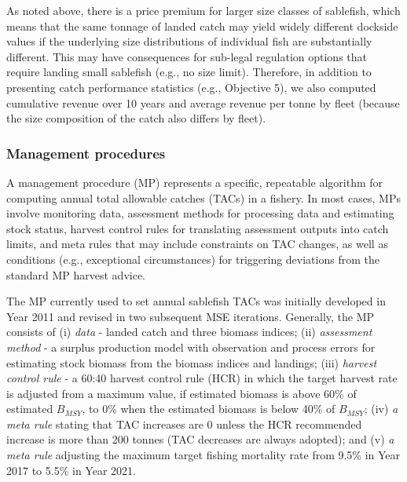 \documentclass[11pt]{book}
\begin{document}
As noted above, there is a price premium for larger size classes of sablefish, which means that the same tonnage of landed catch may yield widely different dockside values if the underlying size distributions of individual fish are substantially different. This may have consequences for sub-legal regulation options that require landing small sablefish (e.g., no size limit). Therefore, in addition to presenting catch performance statistics (e.g., Objective 5), we also computed cumulative revenue over 10 years and average revenue per tonne by fleet (because the size composition of the catch also differs by fleet).

\hypertarget{management-procedures}{%
\subsubsection{Management procedures}\label{management-procedures}}

A management procedure (MP) represents a specific, repeatable algorithm for computing annual total allowable catches (TACs) in a fishery. In most cases, MPs involve monitoring data, assessment methods for processing data and estimating stock status, harvest control rules for translating assessment outputs into catch limits, and meta rules that may include constraints on TAC changes, as well as conditions (e.g., exceptional circumstances) for triggering deviations from the standard MP harvest advice.

The MP currently used to set annual sablefish TACs was initially developed in Year 2011 and revised in two subsequent MSE iterations. Generally, the MP consists of (i) \emph{data} - landed catch and three biomass indices; (ii) \emph{assessment method} - a surplus production model with observation and process errors for estimating stock biomass from the biomass indices and landings; (iii) \emph{harvest control rule} - a 60:40 harvest control rule (HCR) in which the target harvest rate is adjusted from a maximum value, if estimated biomass is above 60\% of estimated \(B_{MSY}\), to 0\% when the estimated biomass is below 40\% of \(B_{MSY}\); (iv) \emph{a meta rule} stating that TAC increases are 0 unless the HCR recommended increase is more than 200 tonnes (TAC decreases are always adopted); and (v) \emph{a meta rule} adjusting the maximum target fishing mortality rate from 9.5\% in Year 2017 to 5.5\% in Year 2021.
\end{document}
